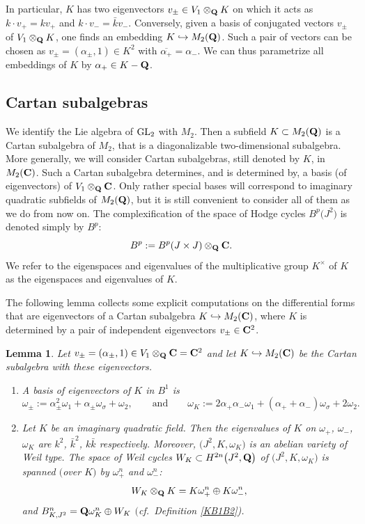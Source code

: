 \documentclass[10pt,a4paper]{amsart}
\numberwithin{equation}{section}
\newtheorem{Lemma}[Theorem]{Lemma}
\begin{document}
In particular, $K$ has two eigenvectors $v_\pm\in V_1\otimes_{\bf Q} K$ on which it acts
as $k\cdot v_+=kv_+$ and $k\cdot v_-=\bar{k} v_-$. Conversely, given a basis of conjugated
vectors $v_\pm$ of $V_1\otimes_{\bf Q} K$, one finds an embedding $K\hookrightarrow M_2({\bf Q})$.
Such a pair of vectors can be chosen as $v_\pm=(\alpha_\pm,1)\in K^2$ with
$\overline{\alpha_+}=\alpha_-$. We can thus parametrize all embeddings of $K$ by $\alpha_+\in K-{\bf Q}$.

\subsection{Cartan subalgebras}\label{csa}
We identify the Lie algebra of ${\rm GL}_2$ with $M_2$. Then a subfield $K\subset M_2({\bf Q})$ is a
Cartan subalgebra of $M_2$, that is a diagonalizable two-dimensional subalgebra.
More generally, we will consider Cartan subalgebras, still denoted by $K$, in $M_2({\bf C})$.
Such a Cartan subalgebra determines, and is determined by, a basis (of eigenvectors) of
$V_1\otimes_{\bf Q}{\bf C}$. Only rather special bases will correspond to imaginary quadratic subfields
of $M_2({\bf Q})$, but it is still convenient to consider all of them as we do from now on.
The complexification of the space of Hodge cycles
$B^p\big(J^2\big)$ is denoted simply by $B^p$:
\[
B^p := B^p(J\times J)\otimes_{\bf Q}{\bf C}.
\]
We refer to the eigenspaces and eigenvalues of the multiplicative group $K^\times$ of $K$
as the eigen\-spaces and eigenvalues of $K$.

The following lemma collects some explicit computations on the differential forms that are
eigenvectors of a Cartan subalgebra $K\hookrightarrow M_2({\bf C})$,
where $K$ is determined by a pair of independent eigenvectors $v_\pm \in {\bf C}^2$.

\begin{Lemma} \label{lemKB}
Let $v_\pm=(\alpha_\pm,1) \in V_1\otimes_{\bf Q}{\bf C}={\bf C}^2$
and let $K\hookrightarrow M_2({\bf C})$
be the Cartan subalgebra with these eigenvectors.
\begin{enumerate}\itemsep=0pt
\item[$1.$] A basis of eigenvectors of $K$ in $B^1$ is
\[
\omega_\pm := \alpha_\pm^2\omega_1 + \alpha_\pm\omega_\sigma + \omega_2,
\qquad\text{and}\qquad
\omega_K := 2\alpha_+\alpha_-\omega_1 + (\alpha_++\alpha_-)\omega_\sigma +
2\omega_2.
\]

\item[$2.$]
Let $K$ be an imaginary quadratic field. Then the eigenvalues of $K$ on $\omega_+$, $\omega_-$, $\omega_K$
are $k^2$, $\bar{k}^2$, $k\bar{k}$ respectively. Moreover, $\big(J^2,K,\omega_K\big)$
is an abelian variety of Weil type.
The space of Weil cycles $W_K\subset H^{2n}\big(J^2,{\bf Q}\big)$
of $\big(J^2,K,\omega_K\big)$ is spanned $($over $K)$ by $\omega_+^n$ and $\omega_-^n$:
\[
W_K\otimes_{\bf Q} K = K\omega_+^n \oplus K\omega_-^n,
\]
and $B^n_{K,J^2}={\bf Q} \omega_K^n\oplus W_K$ $($cf.\ Definition {\rm \ref{KB1B2})}.
\end{enumerate}
\end{Lemma}
\end{document}
